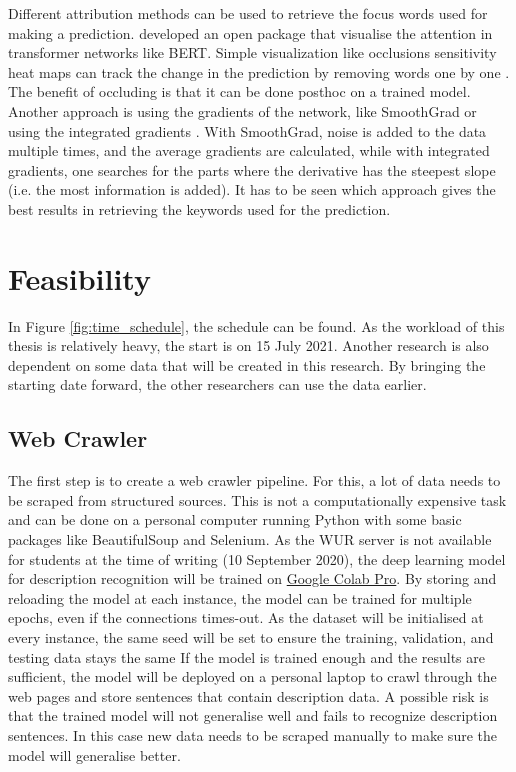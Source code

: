 \documentclass{article}
\begin{document}
Different attribution methods can be used to retrieve the focus words used for making a prediction. 
\textcite{vig_multiscale_2019} developed an open package that visualise the attention in transformer networks like BERT.
Simple visualization like occlusions sensitivity heat maps can track the change in the prediction by removing words one by one \autocite{fleet_visualizing_2014}.
The benefit of occluding is that it can be done posthoc on a trained model.
Another approach is using the gradients of the network, like SmoothGrad \autocite{smilkov_smoothgrad_2017} or using the integrated gradients \autocite{sundararajan_axiomatic_2017}.
With SmoothGrad, noise is added to the data multiple times, and the average gradients are calculated, while with integrated gradients, one searches for the parts where the derivative has the steepest slope (i.e. the most information is added).
It has to be seen which approach gives the best results in retrieving the keywords used for the prediction.

\section{Feasibility}
In Figure \ref{fig:time_schedule}, the schedule can be found. 
As the workload of this thesis is relatively heavy, the start is on 15 July 2021.
Another research is also dependent on some data that will be created in this research.
By bringing the starting date forward, the other researchers can use the data earlier.
\subsection{Web Crawler}
The first step is to create a web crawler pipeline. 
For this, a lot of data needs to be scraped from structured sources.
This is not a computationally expensive task and can be done on a personal computer running Python with some basic packages like BeautifulSoup and Selenium.
As the WUR server is not available for students at the time of writing (10 September 2020), the deep learning model for description recognition will be trained on \href{https://colab.research.google.com/}{Google Colab Pro}. 
By storing and reloading the model at each instance, the model can be trained for multiple epochs, even if the connections times-out.
As the dataset will be initialised at every instance, the same seed will be set to ensure the training, validation, and testing data stays the same
If the model is trained enough and the results are sufficient, the model will be deployed on a personal laptop to crawl through the web pages and store sentences that contain description data.
A possible risk is that the trained model will not generalise well and fails to recognize description sentences.
In this case new data needs to be scraped manually to make sure the model will generalise better.
\end{document}
